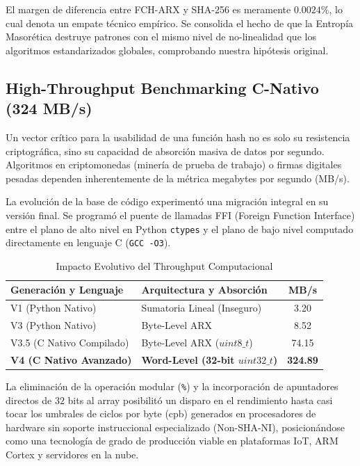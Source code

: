 \documentclass[10pt,journal,compsoc]{IEEEtran}
\begin{document}
El margen de diferencia entre FCH-ARX y SHA-256 es meramente $0.0024\%$, lo cual denota un empate técnico empírico. Se consolida el hecho de que la Entropía Masorética destruye patrones con el mismo nivel de no-linealidad que los algoritmos estandarizados globales, comprobando nuestra hipótesis original.

\subsection{High-Throughput Benchmarking C-Nativo (324 MB/s)}
Un vector crítico para la usabilidad de una función hash no es solo su resistencia criptográfica, sino su capacidad de absorción masiva de datos por segundo. Algoritmos en criptomonedas (minería de prueba de trabajo) o firmas digitales pesadas dependen inherentemente de la métrica megabytes por segundo (MB/s). 

La evolución de la base de código experimentó una migración integral en su versión final. Se programó el puente de llamadas FFI (Foreign Function Interface) entre el plano de alto nivel en Python \texttt{ctypes} y el plano de bajo nivel computado directamente en lenguaje C (\texttt{GCC -O3}). 

\begin{table}[h!]
\centering
\caption{Impacto Evolutivo del Throughput Computacional}
\label{tab:performance}
\begin{tabular}{@{}llc@{}}
\toprule
\textbf{Generación y Lenguaje} & \textbf{Arquitectura y Absorción} & \textbf{MB/s} \\ \midrule
V1 (Python Nativo) & Sumatoria Lineal (Inseguro) & 3.20 \\
V3 (Python Nativo) & Byte-Level ARX & 8.52 \\
V3.5 (C Nativo Compilado) & Byte-Level ARX ($uint8\_t$) & 74.15 \\
\textbf{V4 (C Nativo Avanzado)} & \textbf{Word-Level (32-bit $uint32\_t$)} & \textbf{324.89} \\ \bottomrule
\end{tabular}
\end{table}

La eliminación de la operación modular (\texttt{\%}) y la incorporación de apuntadores directos de $32$ bits al array posibilitó un disparo en el rendimiento hasta casi tocar los umbrales de ciclos por byte (cpb) generados en procesadores de hardware sin soporte instruccional especializado (Non-SHA-NI), posicionándose como una tecnología de grado de producción viable en plataformas IoT, ARM Cortex y servidores en la nube.
\end{document}
